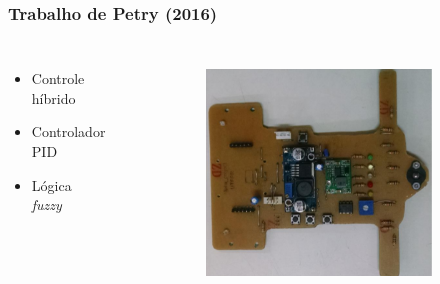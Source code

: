 \begin{frame}
\frametitle{Trabalho de Petry (2016)}
\begin{columns}
	\begin{itemize}
	\item Controle híbrido
	\item Controlador PID
	\item Lógica \textit{fuzzy}
	\end{itemize}
	
	\begin{figure}[h]
     \centering
     \captionsetup{width=0.6\textwidth,font=footnotesize,textfont=bf}
     \begin{subfigure}[b]{0.3\textwidth}
 	\centering
         \includegraphics[width=1\textwidth,height=0.4\textheight]{Figuras/marcio1.png}
         \caption{\centering \label{fig:marcio1}}
     \end{subfigure}
	~     
     \begin{subfigure}[b]{0.3\textwidth}
 	\centering

\end{subfigure}
\end{figure}
\end{columns}
\end{frame}
